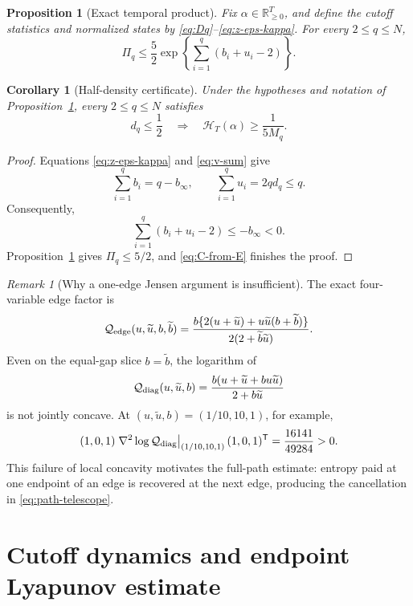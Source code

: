 \documentclass[11pt]{article}
\newtheorem{proposition}[theorem]{Proposition}
\newtheorem{corollary}[theorem]{Corollary}
\theoremstyle{definition}
\theoremstyle{remark}
\newtheorem{remark}[theorem]{Remark}
\newcommand{\R}{\mathbb{R}}
\newcommand{\cert}{\mathcal{H}}
\newcommand{\invprod}{\Pi}
\newcommand{\rankmass}{M}
\newcommand{\rankdens}{d}
\begin{document}
\begin{proposition}[Exact temporal product]
\label{prop:global-product}
Fix \(\alpha\in\R_{\ge0}^T\), and define the cutoff statistics and
normalized states by \eqref{eq:Dq}--\eqref{eq:z-eps-kappa}.  For every
\(2\le q\le N\),
\begin{equation}
 \boxed{
 \invprod_q
 \le\frac52
 \exp\left\{\sum_{i=1}^q(b_i+u_i-2)\right\}.}
 \label{eq:global-product}
\end{equation}
\end{proposition}

\begin{corollary}[Half-density certificate]
\label{cor:small-density}
Under the hypotheses and notation of
Proposition~\ref{prop:global-product}, every \(2\le q\le N\) satisfies
\begin{equation}
 \boxed{
 \rankdens_q\le\frac12
 \quad\Longrightarrow\quad
 \cert_T(\alpha)\ge\frac{1}{5\rankmass_q}.}
 \label{eq:small-density}
\end{equation}
\end{corollary}

\begin{proof}
Equations \eqref{eq:z-eps-kappa} and \eqref{eq:v-sum} give
\[
 \sum_{i=1}^q b_i=q-b_\infty,\qquad
 \sum_{i=1}^q u_i=2q\rankdens_q\le q.
\]
Consequently,
\[
 \sum_{i=1}^q(b_i+u_i-2)\le-b_\infty<0.
\]
Proposition~\ref{prop:global-product} gives \(\invprod_q\le5/2\), and
\eqref{eq:C-from-E} finishes the proof.
\end{proof}

\begin{remark}[Why a one-edge Jensen argument is insufficient]
The exact four-variable edge factor is
\[
 \mathcal Q_{\rm edge}(u,\widetilde u,b,\widetilde b)
 =\frac{b\{2(u+\widetilde u)
        +u\widetilde u(b+\widetilde b)\}}
        {2(2+\widetilde b\widetilde u)}.
\]
Even on the equal-gap slice \(b=\widetilde b\), the logarithm of
\[
 \mathcal Q_{\rm diag}(u,\widetilde u,b)
 =\frac{b(u+\widetilde u
        +bu\widetilde u)}
        {2+b\widetilde u}
\]
is not jointly concave.  At
\((u,\widetilde u,b)=(1/10,10,1)\), for example,
\[
 (1,0,1)
 \left.\nabla^2\log\mathcal Q_{\rm diag}
 \right|_{(1/10,10,1)}
 (1,0,1)^\mathsf T
 =\frac{16141}{49284}>0.
\]
This failure of local concavity motivates the full-path estimate: entropy
paid at one endpoint of an edge is recovered at the next edge, producing the
cancellation in \eqref{eq:path-telescope}.
\end{remark}

\section{Cutoff dynamics and endpoint Lyapunov estimate}
\label{sec:rank}
\end{document}
